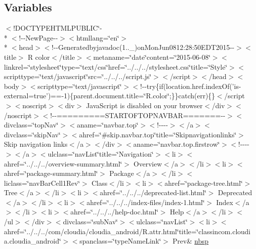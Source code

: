 \subsection*{Variables}
\begin{DoxyCompactItemize}
\item 
$<$!D\-O\-C\-T\-Y\-P\-E\-H\-T\-M\-L\-P\-U\-B\-L\-I\-C\char`\"{}-\/\\*
$<$!-\/-\/New\-Page-\/-\/$>$$<$htmllang=\char`\"{}en\char`\"{}$>$\\*
$<$head$>$$<$!-\/-\/Generatedbyjavadoc(1..\-\_)on\-Mon\-Jun0812\-:28\-:50\-E\-D\-T2015-\/-\/$>$$<$title$>$ R color$<$/title$>$$<$metaname=\char`\"{}date\char`\"{}content=\char`\"{}2015-\/06-\/08\char`\"{}$>$$<$linkrel=\char`\"{}stylesheet\char`\"{}type=\char`\"{}text/css\char`\"{}href=\char`\"{}../../../stylesheet.\-css\char`\"{}title=\char`\"{}\-Style\char`\"{}$>$$<$scripttype=\char`\"{}text/javascript\char`\"{}src=\char`\"{}../../../script.\-js\char`\"{}$>$$<$/script$>$$<$/head$>$$<$body$>$$<$scripttype=\char`\"{}text/javascript\char`\"{}$>$$<$!-\/-\/try\{if(location.\-href.\-index\-Of('is-\/external=true')==-\/1)\{parent.\-document.\-title=\char`\"{}\-R.\-color\char`\"{};\}\}catch(err)\{\}$<$/script$>$$<$noscript$>$$<$div$>$ Java\-Script is disabled on your browser$<$/div$>$$<$/noscript$>$$<$!-\/-\/=========\-S\-T\-A\-R\-T\-O\-F\-T\-O\-P\-N\-A\-V\-B\-A\-R=======-\/-\/$>$$<$divclass=\char`\"{}top\-Nav\char`\"{}$>$$<$aname=\char`\"{}navbar.\-top\char`\"{}$>$$<$!-\/-\/-\/-\/$>$$<$/a$>$$<$divclass=\char`\"{}skip\-Nav\char`\"{}$>$$<$ahref=\char`\"{}\#skip.\-navbar.\-top\char`\"{}title=\char`\"{}\-Skipnavigationlinks\char`\"{}$>$ Skip navigation links$<$/a$>$$<$/div$>$$<$aname=\char`\"{}navbar.\-top.\-firstrow\char`\"{}$>$$<$!-\/-\/-\/-\/$>$$<$/a$>$$<$ulclass=\char`\"{}nav\-List\char`\"{}title=\char`\"{}\-Navigation\char`\"{}$>$$<$li$>$$<$ahref=\char`\"{}../../../overview-\/summary.\-html\char`\"{}$>$ Overview$<$/a$>$$<$/li$>$$<$li$>$$<$ahref=\char`\"{}package-\/summary.\-html\char`\"{}$>$ Package$<$/a$>$$<$/li$>$$<$liclass=\char`\"{}nav\-Bar\-Cell1\-Rev\char`\"{}$>$ Class$<$/li$>$$<$li$>$$<$ahref=\char`\"{}package-\/tree.\-html\char`\"{}$>$ Tree$<$/a$>$$<$/li$>$$<$li$>$$<$ahref=\char`\"{}../../../deprecated-\/list.\-html\char`\"{}$>$ Deprecated$<$/a$>$$<$/li$>$$<$li$>$$<$ahref=\char`\"{}../../../index-\/files/index-\/1.\-html\char`\"{}$>$ Index$<$/a$>$$<$/li$>$$<$li$>$$<$ahref=\char`\"{}../../../help-\/doc.\-html\char`\"{}$>$ Help$<$/a$>$$<$/li$>$$<$/ul$>$$<$/div$>$$<$divclass=\char`\"{}sub\-Nav\char`\"{}$>$$<$ulclass=\char`\"{}nav\-List\char`\"{}$>$$<$li$>$$<$ahref=\char`\"{}../../../com/cloudia/cloudia\-\_\-android/\-R.\-attr.\-html\char`\"{}title=\char`\"{}classincom.\-cloudia.\-cloudia\-\_\-android\char`\"{}$>$$<$spanclass=\char`\"{}type\-Name\-Link\char`\"{}$>$ Prev\& \hyperlink{_r_8color_8html_aef915316f784c9063d942974538301a6}{nbsp}

\end{DoxyCompactItemize}
